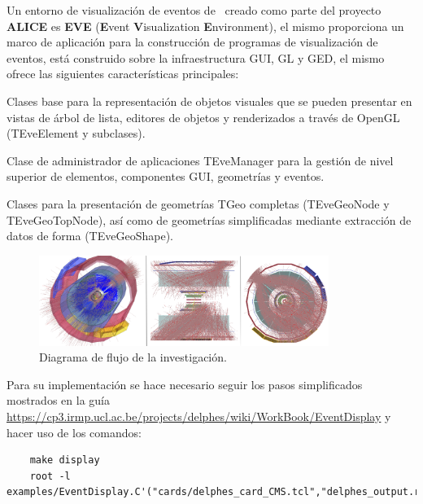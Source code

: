 
Un entorno de visualización de eventos de \ROOT ~creado como parte del proyecto \textbf{ALICE} es \textbf{EVE} (\textbf{E}vent \textbf{V}isualization \textbf{E}nvironment), el mismo proporciona un marco de aplicación para la construcción de programas de visualización de eventos, está construido sobre la infraestructura GUI, GL y GED, el mismo ofrece las siguientes características principales:

\begin{itemize_f}
	\item[-] Clases base para la representación de objetos visuales que se pueden presentar en vistas de árbol de lista, editores de objetos y renderizados a 	través de OpenGL (TEveElement y subclases).
	\item[-] Clase de administrador de aplicaciones TEveManager para la gestión de nivel superior de elementos, componentes GUI, geometrías y eventos.
	\item[-] Clases para la presentación de geometrías TGeo completas (TEveGeoNode y TEveGeoTopNode), así como de geometrías simplificadas mediante extracción de datos de forma (TEveGeoShape).
\end{itemize_f}

\begin{figure}[ht!]
    \centering
    \includegraphics[width=0.84\textwidth]{Analisis_y_Resultados/imagenes/Eve_rand-alieve2.png}
    \caption{Diagrama de flujo de la investigación.}
    \label{fig:Eve_rand-alieve}
\end{figure}
Para su implementación se hace necesario seguir los pasos simplificados mostrados en la guía \url{https://cp3.irmp.ucl.ac.be/projects/delphes/wiki/WorkBook/EventDisplay} y hacer uso de los comandos:

\begin{minipage}{0.9\linewidth}
\vspace{5pt}%
{\small 
\begin{verbatim}
	make display
	root -l examples/EventDisplay.C'("cards/delphes_card_CMS.tcl","delphes_output.root")'
\end{verbatim}}
\end{minipage}